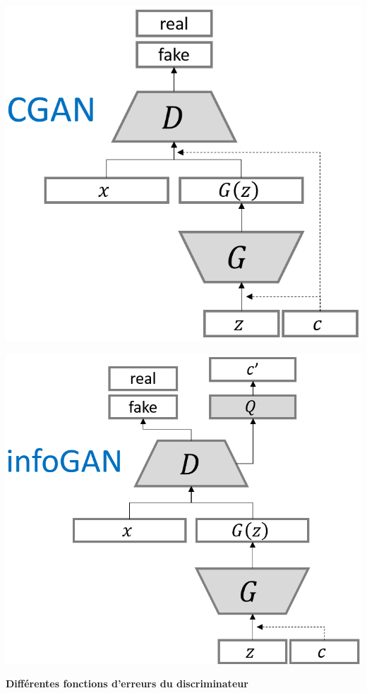 \documentclass[a0,portrait]{a0poster}
\begin{document}
\begin{multicols}{2}
\begin{tcolorbox}[colback=blue!5!white,colframe=blue!75!black,title={\section*{Différents types de GAN}}]
\begin{center}
\begin{minipage}{0.31\textwidth}
    \includegraphics[width=1.0\textwidth]{./CGAN_structure.png}
\end{minipage}
\begin{minipage}{0.35\textwidth}
    \includegraphics[width=1.0\textwidth]{./INFOGAN_structure.png}
\end{minipage}
\end{center}
\textbf{Différentes fonctions d'erreurs du discriminateur}

\end{tcolorbox}
\end{multicols}
\end{document}
